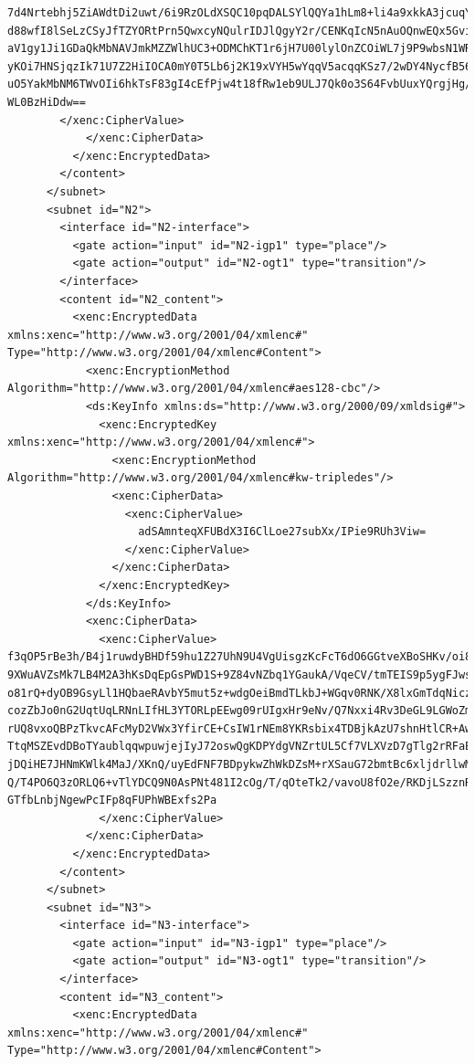 \begin{lstlisting}
7d4Nrtebhj5ZiAWdtDi2uwt/6i9RzOLdXSQC10pqDALSYlQQYa1hLm8+li4a9xkkA3jcuqYXaIku
d88wfI8lSeLzCSyJfTZYORtPrn5QwxcyNQulrIDJlQgyY2r/CENKqIcN5nAuOQnwEQx5GvihSEEk
aV1gy1Ji1GDaQkMbNAVJmkMZZWlhUC3+ODMChKT1r6jH7U00lylOnZCOiWL7j9P9wbsN1WR+49CE
yKOi7HNSjqzIk71U7Z2HiIOCA0mY0T5Lb6j2K19xVYH5wYqqV5acqqKSz7/2wDY4NycfB56y2Uor
uO5YakMbNM6TWvOIi6hkTsF83gI4cEfPjw4t18fRw1eb9ULJ7Qk0o3S64FvbUuxYQrgjHg/MfM9d
WL0BzHiDdw==
        </xenc:CipherValue>
            </xenc:CipherData>
          </xenc:EncryptedData>
        </content>
      </subnet>
      <subnet id="N2">
        <interface id="N2-interface">
          <gate action="input" id="N2-igp1" type="place"/>
          <gate action="output" id="N2-ogt1" type="transition"/>
        </interface>
        <content id="N2_content">
          <xenc:EncryptedData xmlns:xenc="http://www.w3.org/2001/04/xmlenc#" Type="http://www.w3.org/2001/04/xmlenc#Content">
            <xenc:EncryptionMethod Algorithm="http://www.w3.org/2001/04/xmlenc#aes128-cbc"/>
            <ds:KeyInfo xmlns:ds="http://www.w3.org/2000/09/xmldsig#">
              <xenc:EncryptedKey xmlns:xenc="http://www.w3.org/2001/04/xmlenc#">
                <xenc:EncryptionMethod Algorithm="http://www.w3.org/2001/04/xmlenc#kw-tripledes"/>
                <xenc:CipherData>
                  <xenc:CipherValue>
                    adSAmnteqXFUBdX3I6ClLoe27subXx/IPie9RUh3Viw=
                  </xenc:CipherValue>
                </xenc:CipherData>
              </xenc:EncryptedKey>
            </ds:KeyInfo>
            <xenc:CipherData>
              <xenc:CipherValue>
f3qOP5rBe3h/B4j1ruwdyBHDf59hu1Z27UhN9U4VgUisgzKcFcT6dO6GGtveXBoSHKv/oi8ZVCsS
9XWuAVZsMk7LB4M2A3hKsDqEpGsPWD1S+9Z84vNZbq1YGaukA/VqeCV/tmTEIS9p5ygFJwszS9Ri
o81rQ+dyOB9GsyLl1HQbaeRAvbY5mut5z+wdgOeiBmdTLkbJ+WGqv0RNK/X8lxGmTdqNiczWvHQ7
cozZbJo0nG2UqtUqLRNnLIfHL3YTORLpEEwg09rUIgxHr9eNv/Q7Nxxi4Rv3DeGL9LGWoZm2F8a6
rUQ8vxoQBPzTkvcAFcMyD2VWx3YfirCE+CsIW1rNEm8YKRsbix4TDBjkAzU7shnHtlCR+AwSF24V
TtqMSZEvdDBoTYaublqqwpuwjejIyJ72oswQgKDPYdgVNZrtUL5Cf7VLXVzD7gTlg2rRFaEPUlID
jDQiHE7JHNmKWlk4MaJ/XKnQ/uyEdFNF7BDpykwZhWkDZsM+rXSauG72bmtBc6xljdrllwMtE9pV
Q/T4PO6Q3zORLQ6+vTlYDCQ9N0AsPNt481I2cOg/T/qOteTk2/vavoU8fO2e/RKDjLSzznRe52aV
GTfbLnbjNgewPcIFp8qFUPhWBExfs2Pa
              </xenc:CipherValue>
            </xenc:CipherData>
          </xenc:EncryptedData>
        </content>
      </subnet>
      <subnet id="N3">
        <interface id="N3-interface">
          <gate action="input" id="N3-igp1" type="place"/>
          <gate action="output" id="N3-ogt1" type="transition"/>
        </interface>
        <content id="N3_content">
          <xenc:EncryptedData xmlns:xenc="http://www.w3.org/2001/04/xmlenc#" Type="http://www.w3.org/2001/04/xmlenc#Content">

\end{lstlisting}
